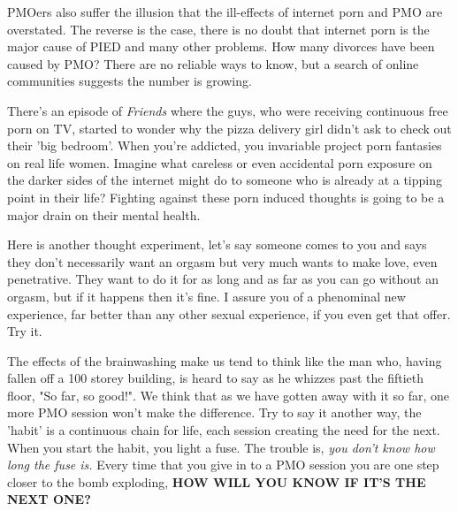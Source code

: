 \documentclass[easypeasy.tex]{subfiles}
\begin{document}
PMOers also suffer the illusion that the ill-effects of internet porn and PMO are overstated. The reverse is the case, there is no doubt that internet porn is the major cause of PIED and many other problems. How many divorces have been caused by PMO? There are no reliable ways to know, but a search of online communities suggests the number is growing.

There's an episode of \textit{Friends} where the guys, who were receiving continuous free porn on TV, started to wonder why the pizza delivery girl didn't ask to check out their 'big bedroom'. When you're addicted, you invariable project porn fantasies on real life women. Imagine what careless or even accidental porn exposure on the darker sides of the internet might do to someone who is already at a tipping point in their life? Fighting against these porn induced thoughts is going to be a major drain on their mental health.

Here is another thought experiment, let's say someone comes to you and says they don't necessarily want an orgasm but very much wants to make love, even penetrative. They want to do it for as long and as far as you can go without an orgasm, but if it happens then it's fine. I assure you of a phenominal new experience, far better than any other sexual experience, if you even get that offer. Try it.

The effects of the brainwashing make us tend to think like the man who, having fallen off a 100 storey building, is heard to say as he whizzes past the fiftieth floor, "So far, so good!". We think that as we have gotten away with it so far, one more PMO session won't make the difference. Try to say it another way, the 'habit' is a continuous chain for life, each session creating the need for the next. When you start the habit, you light a fuse. The trouble is, \textit{you don't know how long the fuse is.} Every time that you give in to a PMO session you are one step closer to the bomb exploding, \textbf{HOW WILL YOU KNOW IF IT'S THE NEXT ONE?}
\end{document}
